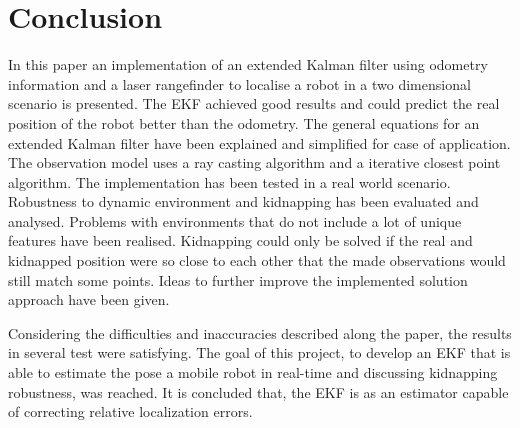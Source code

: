 \section{Conclusion}
\label{sec:Conclusion}


In this paper an implementation of an extended Kalman filter using odometry information and a laser rangefinder to localise a robot in a two dimensional scenario is presented. The EKF achieved good results and could predict the real position of the robot better than the odometry. The general equations for an extended Kalman filter have been explained and simplified for case of application. The observation model uses a ray casting algorithm and a iterative closest point algorithm. The implementation has been tested in a real world scenario. Robustness to dynamic environment and kidnapping has been evaluated and analysed. Problems with environments that do not include a lot of unique features have been realised. Kidnapping could only be solved if the real and kidnapped position were so close to each other that the made observations would still match some points. Ideas to further improve the implemented solution approach have been given.

Considering the difficulties and inaccuracies described along the paper, the results in several test were satisfying. The goal of this project, to develop an EKF that is able to estimate the pose a mobile robot in real-time and discussing kidnapping robustness, was reached. It is concluded that, the EKF is as an estimator capable of correcting relative localization errors. 


